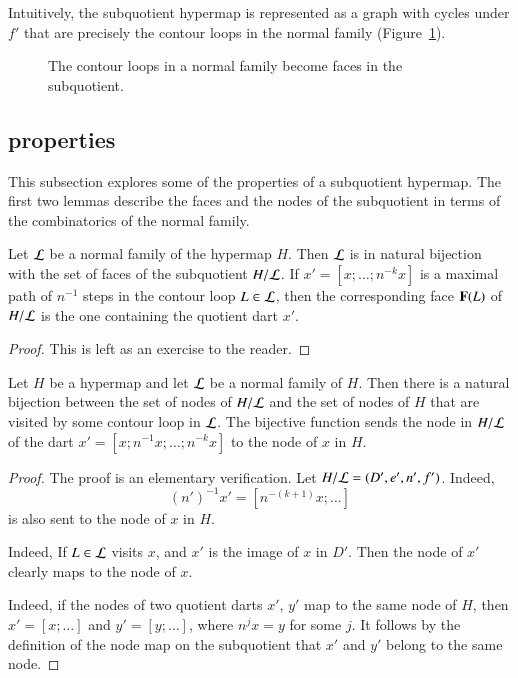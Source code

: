 Intuitively, the subquotient hypermap is represented as a graph with
cycles under $f'$ that are precisely the contour loops in the normal family
(Figure~\ref{fig:quot}).


\begin{figure}[htb]
\centering
{}
\caption{The contour loops in a normal family become faces in the
subquotient.}
\label{fig:quot}
\end{figure}

\subsection{properties}

This subsection explores some of the properties of a subquotient hypermap.
The first two lemmas describe the faces and the nodes of the subquotient
in terms of the combinatorics of the normal family.

\begin{lemma}\label{lemma:subquotient-bijection}
  Let ${\cal L}$ be a normal family of the hypermap $H$.  Then ${\cal
    L}$ is in natural bijection with the set of faces of the subquotient
  $H/{\cal L}$.  If $x'=[x;\ldots;n^{-k}x]$ is a maximal path of
  $n^{-1}$ steps in the contour loop $L\in{\cal L}$, then the
  corresponding face ${\mathbf F}(L)$ of $H/{\cal L}$ is the
  one containing the quotient dart $x'$.
\end{lemma}

\begin{proof}  This is left as an exercise to the reader.
\end{proof}


\begin{lemma}\label{lemma:subquotient-node}
Let $H$ be a hypermap and let ${\cal L}$ be a normal family of $H$.
Then there is a natural bijection between  the set of nodes of
$H/{\cal L}$ and the set of nodes of $H$ that
are visited by some contour loop in ${\cal L}$.   
The bijective function sends the node in $H/{\cal L}$ of 
the dart $x' = [x;n^{-1} x;\ldots;n^{-k}x]$ to the node of $x$ in $H$.
\end{lemma}

\begin{proof}  The proof is an elementary verification.
Let $H/{\cal L} = (D',e',n',f')$.
  Indeed, 
 \[ 
(n')^{-1} x' = [n^{-(k+1)} x;\ldots]
\] 
 is also sent to the node of $x$ in $H$.

  Indeed,
If $L\in {\cal L}$ visits $x$,  and $x'$ is the image of $x$ in $D'$.
Then the node of $x'$ clearly maps to the node of $x$.  

  Indeed, if the nodes of
two quotient darts $x'$, $y'$ map to the same node of $H$, then
$x'=[x;\ldots]$ and $y'=[y;\ldots]$, where $n^j x = y$ for some $j$.
It follows by the definition of the node map on the subquotient that
$x'$ and $y'$ belong to the same node.
\end{proof}

